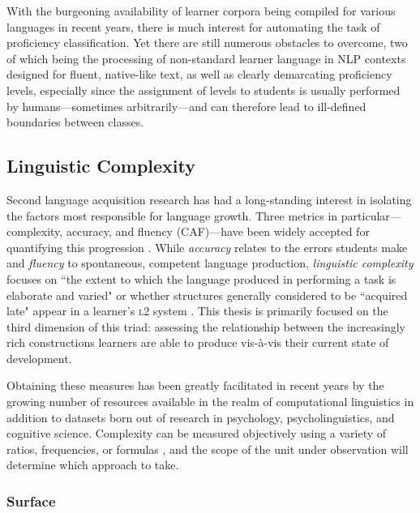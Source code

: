 With the burgeoning availability of learner corpora being compiled for various languages in recent years, there is much interest for automating the task of proficiency classification. Yet there are still numerous obstacles to overcome, two of which being the processing of non-standard learner language in NLP contexts designed for fluent, native-like text, as well as clearly demarcating proficiency levels, especially since the assignment of levels to students is usually performed by humans—sometimes arbitrarily—and can therefore lead to ill-defined boundaries between classes.


\subsection{Linguistic Complexity}
\label{section:lc}

Second language acquisition research has had a long-standing interest in isolating the factors most responsible for language growth. Three metrics in particular—complexity, accuracy, and fluency (CAF)—have been widely accepted for quantifying this progression \citep{housen2009}. While \textit{accuracy} relates to the errors students make and \textit{fluency} to spontaneous, competent language production, \textit{linguistic complexity} focuses on ``the extent to which the language produced in performing a task is elaborate and varied" \citep{ellis2003} or whether structures generally considered to be ``acquired late" appear in a learner's {\scshape l2} system \citep{pallotti2009}. This thesis is primarily focused on the third dimension of this triad: assessing the relationship between the increasingly rich constructions learners are able to produce vis-à-vis their current state of development.

Obtaining these measures has been greatly facilitated in recent years by the growing number of resources available in the realm of computational linguistics in addition to datasets born out of research in psychology, psycholinguistics, and cognitive science. Complexity can be measured objectively using a variety of ratios, frequencies, or formulas \citep{norris2009}, and the scope of the unit under observation will determine which approach to take.

\subsubsection{Surface}

